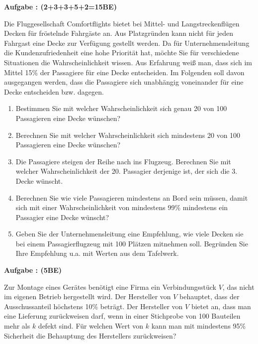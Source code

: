\documentclass[a4paper,12pt]{article}
\newcounter{aufgabencounter}
\newcommand{\aufgabeNr}{\stepcounter{aufgabencounter}{\theaufgabencounter}}
\newcommand{\Aufgabe}[1]{
  {
  \vspace*{0.5cm}
  \textsf{\textbf{Aufgabe \aufgabeNr #1}}
  \vspace*{0.2cm}
  
  }
}
\begin{document}
\Aufgabe{: (2+3+3+5+2=15BE)}
Die Fluggesellschaft Comfortflights bietet bei Mittel- und Langstreckenflügen Decken für fröstelnde Fahrgäste an. Aus Platzgründen kann nicht für jeden Fahrgast eine Decke zur Verfügung gestellt werden. Da für Unternehmensleitung die Kundenzufriedenheit eine hohe Priorität hat, möchte Sie für verschiedene Situationen die Wahrscheinlichkeit wissen. Aus Erfahrung weiß man, dass sich im Mittel 15\% der Passagiere für eine Decke entscheiden. Im Folgenden soll davon ausgegangen werden, dass die Passagiere sich unabhängig voneinander für eine Decke entscheiden bzw. dagegen.
\begin{enumerate}[label={\alph*)}]
  \item Bestimmen Sie mit welcher Wahrscheinlichkeit sich genau 20 von 100 Passagieren eine Decke wünschen?
  \item Berechnen Sie mit welcher Wahrscheinlichkeit sich mindestens 20 von 100 Passagieren  eine Decke wünschen?
  \item Die Passagiere steigen der Reihe nach ins Flugzeug. Berechnen Sie mit welcher Wahrscheinlichkeit der 20. Passagier derjenige ist, der sich die 3. Decke wünscht.
  \item Berechnen Sie wie viele Passagieren mindestens an Bord sein müssen, damit sich mit einer Wahrscheinlichkeit von mindestens 99\% mindestens ein Passagier eine Decke wünscht?
  \item Geben Sie der Unternehmensleitung eine Empfehlung, wie viele Decken sie bei einem Passagierflugzeug mit 100 Plätzen mitnehmen soll. Begründen Sie Ihre Empfehlung u.a. mit Werten aus dem Tafelwerk.
\end{enumerate}

\Aufgabe{: (5BE)}
Zur Montage eines Gerätes benötigt eine Firma ein Verbindungsstück $V$, das nicht im eigenen Betrieb hergestellt wird. Der Hersteller von $V$ behauptet, dass der Ausschussanteil höchstens 10\% beträgt. Der Hersteller von $V$ bietet an, dass man eine Lieferung zurückweisen darf, wenn in einer Stichprobe von 100 Bauteilen mehr als $k$ defekt sind. Für welchen Wert von $k$ kann man mit mindestens 95\% Sicherheit die Behauptung des Herstellers zurückweisen?
\end{document}
